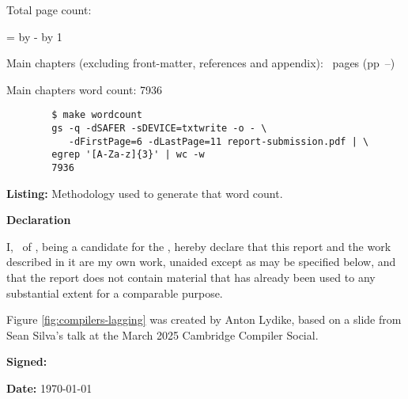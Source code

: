 \begin{sffamily}
Total page count: \pageref{LastPage}

\makeatletter
\@tempcnta=\relax%
\advance\@tempcnta by -%
\advance\@tempcnta by 1%
\xdef\contentpages{\the\@tempcnta}%
\makeatother

Main chapters (excluding front-matter, references and appendix):
\contentpages~pages
(pp~\pageref{firstcontentpage}--\pageref{lastcontentpage})

Main chapters word count: 7936

\vspace*{2em}
\begin{code}
    \begin{verbatim}
        $ make wordcount
        gs -q -dSAFER -sDEVICE=txtwrite -o - \
           -dFirstPage=6 -dLastPage=11 report-submission.pdf | \
        egrep '[A-Za-z]{3}' | wc -w
        7936
    \end{verbatim}
    \captionsetup{textfont=sf}
    \caption*{\textbf{Listing:} Methodology used to generate that word count.}
\end{code}



\vspace{\fill}
\onehalfspacing
\makeatletter
\textbf{\Huge Declaration}
\vspace{40pt}

I, \@author\ of \college, being a candidate for the \course, hereby
declare that this report and the work described in it are my own work,
unaided except as may be specified below, and that the report does not
contain material that has already been used to any substantial extent
for a comparable purpose.

Figure \ref{fig:compilers-lagging} was created by Anton Lydike, based on a slide from Sean Silva's talk at the March 2025 Cambridge Compiler Social.

\bigskip
\textbf{Signed:} \@author

\bigskip
\textbf{Date:} \today
\vspace{\fill}

\makeatother

\end{sffamily}

\fi
